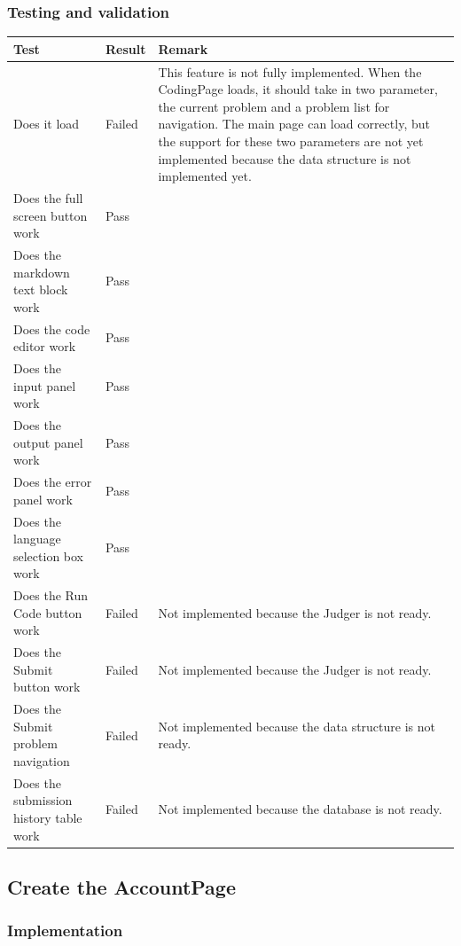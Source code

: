 \documentclass[a4paper]{report}
\begin{document}
\subsubsection{Testing and validation}

\begin{tabulary}{\linewidth}{|L|l|L|}
    \hline
    Test & Result & Remark \\
    \hline
    Does it load & Failed & This feature is not fully implemented. When the CodingPage loads, it should take in two parameter, the current problem and a problem list for navigation. The main page can load correctly, but the support for these two parameters are not yet implemented because the data structure is not implemented yet. \\
    \hline
    Does the full screen button work & Pass & \\
    \hline
    Does the markdown text block work & Pass & \\
    \hline
    Does the code editor work & Pass & \\
    \hline
    Does the input panel work & Pass & \\
    \hline
    Does the output panel work & Pass & \\
    \hline
    Does the error panel work & Pass & \\
    \hline
    Does the language selection box work & Pass & \\
    \hline
    Does the Run Code button work & Failed & Not implemented because the Judger is not ready. \\
    \hline
    Does the Submit button work & Failed & Not implemented because the Judger is not ready. \\
    \hline
    Does the Submit problem navigation & Failed & Not implemented because the data structure is not ready. \\
    \hline
    Does the submission history table work & Failed & Not implemented because the database is not ready. \\
    \hline
\end{tabulary}

\subsection{Create the AccountPage}

\subsubsection{Implementation}
\end{document}
